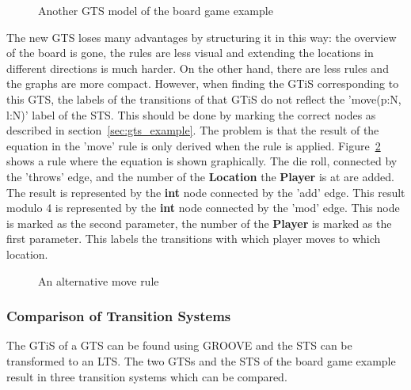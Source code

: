 \begin{figure}[h]
  \begin{center}
    \quad
  \end{center}
  \caption{Another GTS model of the board game example}
  \label{fig:example_groove2}
\end{figure}

The new GTS loses many advantages by structuring it in this way: the overview of the board is gone, the rules are less visual and extending the locations in different directions is much harder. On the other hand, there are less rules and the graphs are more compact. However, when finding the GTiS corresponding to this GTS, the labels of the transitions of that GTiS do not reflect the 'move(p:N, l:N)' label of the STS. This should be done by marking the correct nodes as described in section~\ref{sec:gts_example}. The problem is that the result of the equation in the 'move' rule is only derived when the rule is applied. Figure~\ref{fig:move3} shows a rule where the equation is shown graphically. The die roll, connected by the 'throws' edge, and the number of the \textbf{Location} the \textbf{Player} is at are added. The result is represented by the \textbf{int} node connected by the 'add' edge. This result modulo 4 is represented by the \textbf{int} node connected by the 'mod' edge. This node is marked as the second parameter, the number of the \textbf{Player} is marked as the first parameter. This labels the transitions with which player moves to which location.

\begin{figure}[h]
  \begin{center}
    
  \end{center}
  \caption{An alternative move rule}
  \label{fig:move3}
\end{figure}

\subsubsection{Comparison of Transition Systems}
The GTiS of a GTS can be found using GROOVE and the STS can be transformed to an LTS. The two GTSs and the STS of the board game example result in three transition systems which can be compared.

